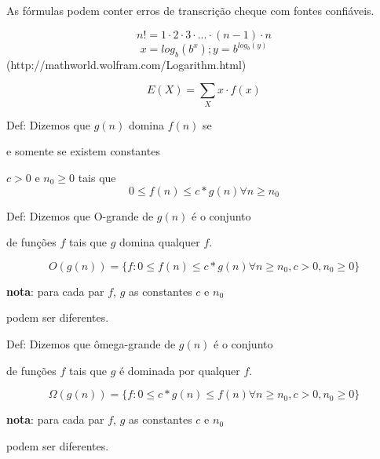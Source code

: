 \documentclass{article}
\begin{document}
As f\'{o}rmulas podem conter erros de transcri\c{c}\~{a}o cheque com fontes confi\'{a}veis.

\[n!=1\cdot 2 \cdot3 \cdot ... \cdot (n-1) \cdot n\]
\[x=log_{b}(b^{x}); y=b^{log_{b}(y)}\] (http://mathworld.wolfram.com/Logarithm.html)

\[E(X)= \sum_{X}x \cdot f(x)\]

\begin {center}
Def: Dizemos que $g(n)$ domina $f(n)$ se

e somente se existem constantes 

$c > 0$ e $n_0 \geq 0$ tais que
\[0 \leq f(n) \leq c*g(n)  \forall n \geq n_0\]
\end {center}

\begin {center}

Def: Dizemos que O-grande de $g(n)$ \'{e} o conjunto

de fun\c{c}\~{o}es $f$ tais que $g$ domina qualquer $f$. 

\[O(g(n))=\{f: 0 \leq f(n) \leq c*g(n)  \forall n \geq n_0, c>0, n_0 \geq 0\}\]

{\bf nota}: para cada par $f$, $g$ as constantes $c$ e $n_0$ 

podem ser diferentes.

\end {center}


\begin {center}

Def: Dizemos que \^{o}mega-grande de $g(n)$ \'{e} o conjunto

de fun\c{c}\~{o}es $f$ tais que $g$ \'{e} dominada por qualquer $f$. 

\[\Omega(g(n))=\{f: 0 \leq c*g(n) \leq f(n)  \forall n \geq n_0, c>0, n_0 \geq 0\}\]

{\bf nota}: para cada par $f$, $g$ as constantes $c$ e $n_0$ 

podem ser diferentes.

\end {center}
\end{document}
